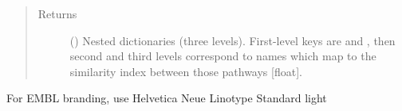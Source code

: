\documentclass[letterpaper,10pt,english]{sphinxmanual}
\begin{document}
\begin{fulllineitems}
\begin{fulllineitems}
\begin{quote}
\begin{description}
\item[{Returns}] \leavevmode
() \textendash{} Nested dictionaries (three levels). First-level
keys are  and , then second and third
levels correspond to  names which map
to the similarity index between those pathways {[}float{]}.

\end{description}\end{quote}

\end{fulllineitems}


\begin{fulllineitems}
\label{\detokenize{reference:pypath.main.PyPath.source_diagram}}
\end{fulllineitems}


\begin{fulllineitems}
\label{\detokenize{reference:pypath.main.PyPath.source_network}}
For EMBL branding, use Helvetica Neue Linotype Standard light

\end{fulllineitems}



\end{fulllineitems}
\end{document}
